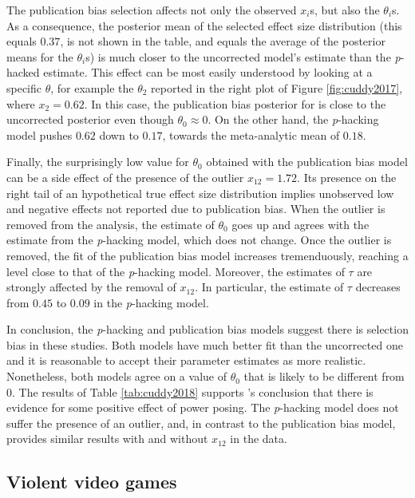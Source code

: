 \documentclass[useAMS,usenatbib,referee]{biom}
\begin{document}
The publication bias selection affects not only the observed $x_{i}$s, but also the $\theta_{i}$s. As a consequence, the posterior mean of the selected effect size distribution (this equals $0.37$, is not shown in the table, and equals the average of the posterior means for the $\theta_{i}$s) is much closer to the uncorrected model's estimate than the \textit{p}-hacked estimate. This effect can be most easily understood by looking at a specific $\theta$, for example the $\theta_2$ reported in the right plot of Figure \ref{fig:cuddy2017}, where $x_{2}=0.62$. In this case, the publication bias posterior for is close to the uncorrected posterior even though $\theta_0 \approx 0$. On the other hand, the \textit{p}-hacking model pushes $0.62$ down to $0.17$, towards the meta-analytic mean of $0.18$.

Finally, the surprisingly low value for $\theta_0$ obtained with the publication bias model can be a side effect of the presence of the outlier $x_{12} = 1.72$. Its presence on the right tail of an hypothetical true effect size distribution implies unobserved low and negative effects not reported due to publication bias. When the outlier is removed from the analysis, the estimate of $\theta_{0}$ goes up and agrees with the estimate from the \textit{p}-hacking model, which does not change. Once the outlier is removed, the fit of the publication bias model increases tremenduously, reaching a level close to that of the \textit{p}-hacking model. Moreover, the estimates of $\tau$ are strongly affected by the removal of $x_{12}$. In particular, the estimate of $\tau$ decreases from $0.45$ to $0.09$ in the \textit{p}-hacking model.



In conclusion, the \textit{p}-hacking and publication bias models suggest there is selection bias in these studies. Both models have much better fit than the uncorrected one and it is reasonable to accept their parameter estimates as more realistic. Nonetheless, both models agree on a value of $\theta_{0}$ that is likely to be different from $0$. The results of Table \ref{tab:cuddy2018} supports \citet{cuddy2018p}'s conclusion that there is evidence for some positive effect of power posing. The \textit{p}-hacking model does not suffer the presence of an outlier, and, in contrast to the publication bias model, provides similar results with and without $x_{12}$ in the data.

\subsection{Violent video games\label{subsec:Anderson}}
\end{document}
